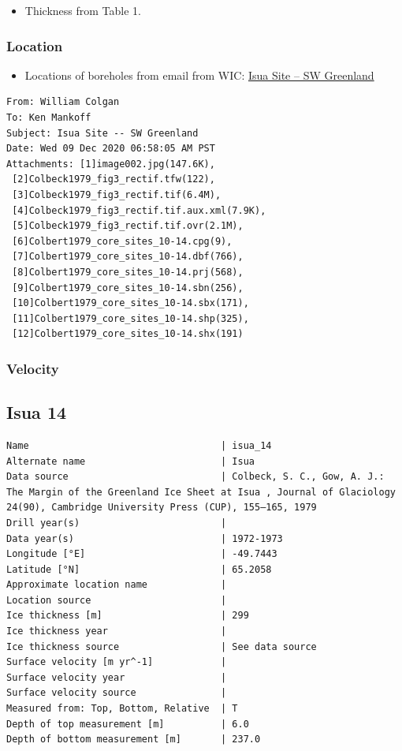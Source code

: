 \documentclass[article,a4paper,times,11pt,twoside]{article}
\begin{document}
\begin{itemize}
\item Thickness from \textcite{colbeck_1979} Table 1.
\end{itemize}

\subsubsection{Location}
\label{sec:orgc8486b4}

\begin{itemize}
\item Locations of boreholes from email from WIC: \href{msgid:AM0PR04MB6129F131ECD9123E72752945A2CC0@AM0PR04MB6129.eurprd04.prod.outlook.com}{Isua Site -- SW Greenland}
\end{itemize}

\begin{verbatim}
From: William Colgan
To: Ken Mankoff
Subject: Isua Site -- SW Greenland
Date: Wed 09 Dec 2020 06:58:05 AM PST
Attachments: [1]image002.jpg(147.6K),
 [2]Colbeck1979_fig3_rectif.tfw(122),
 [3]Colbeck1979_fig3_rectif.tif(6.4M),
 [4]Colbeck1979_fig3_rectif.tif.aux.xml(7.9K),
 [5]Colbeck1979_fig3_rectif.tif.ovr(2.1M),
 [6]Colbert1979_core_sites_10-14.cpg(9),
 [7]Colbert1979_core_sites_10-14.dbf(766),
 [8]Colbert1979_core_sites_10-14.prj(568),
 [9]Colbert1979_core_sites_10-14.sbn(256),
 [10]Colbert1979_core_sites_10-14.sbx(171),
 [11]Colbert1979_core_sites_10-14.shp(325),
 [12]Colbert1979_core_sites_10-14.shx(191)
\end{verbatim}

\subsubsection{Velocity}
\label{sec:org50753c8}
\clearpage
\subsection{Isua 14}
\label{sec:orga8b449c}
\begin{verbatim}
Name                                  | isua_14
Alternate name                        | Isua
Data source                           | Colbeck, S. C., Gow, A. J.: The Margin of the Greenland Ice Sheet at Isua , Journal of Glaciology 24(90), Cambridge University Press (CUP), 155–165, 1979 
Drill year(s)                         | 
Data year(s)                          | 1972-1973
Longitude [°E]                        | -49.7443
Latitude [°N]                         | 65.2058
Approximate location name             | 
Location source                       | 
Ice thickness [m]                     | 299
Ice thickness year                    | 
Ice thickness source                  | See data source
Surface velocity [m yr^-1]            | 
Surface velocity year                 | 
Surface velocity source               | 
Measured from: Top, Bottom, Relative  | T
Depth of top measurement [m]          | 6.0
Depth of bottom measurement [m]       | 237.0
\end{verbatim}
\end{document}
